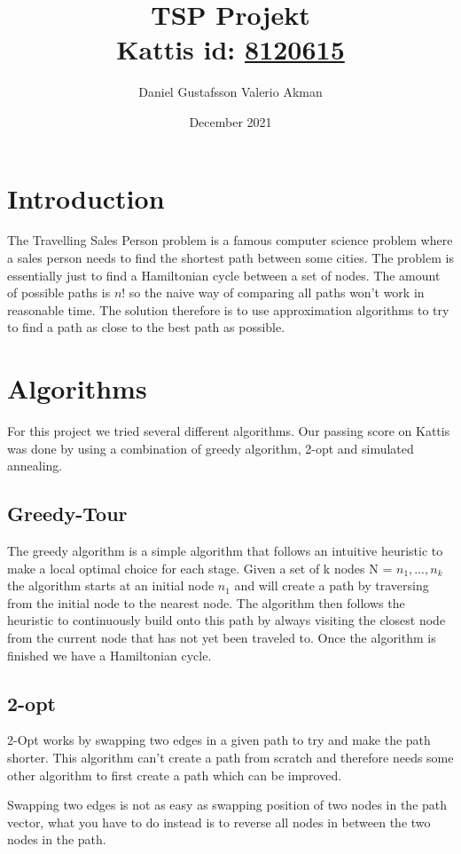 \documentclass{article}[11pt, a4paper]
\title{TSP Projekt \\ Kattis id: \href{https://kth.kattis.com/submissions/8120615}{8120615}}
\author{Daniel Gustafsson \cr Valerio Akman}
\date{December 2021}
\begin{document}
\maketitle

\section{Introduction}
The Travelling Sales Person problem is a famous computer science problem where a sales person needs to find the shortest path between some cities. The problem is essentially just to find a Hamiltonian cycle between a set of nodes. The amount of possible paths is $n!$ so the naive way of comparing all paths won't work in reasonable time. The solution therefore is to use approximation algorithms to try to find a path as close to the best path as possible.

\section{Algorithms}
For this project we tried several different algorithms. Our passing score on Kattis was done by using a combination of greedy algorithm, 2-opt and simulated annealing.

\subsection{Greedy-Tour}
The greedy algorithm is a simple algorithm that follows an intuitive heuristic to make a local optimal choice for each stage. Given a set of k nodes N = ${n_1,...,n_k}$ the algorithm starts at an initial node $n_1$ and will create a path by traversing from the initial node to the nearest node. The algorithm then follows the heuristic to continuously build onto this path by always visiting the closest node from the current node that has not yet been traveled to. Once the algorithm is finished we have a Hamiltonian cycle.

\subsection{2-opt}
2-Opt works by swapping two edges in a given path to try and make the path shorter. This algorithm can't create a path from scratch and therefore needs some other algorithm to first create a path which can be improved. 

Swapping two edges is not as easy as swapping position of two nodes in the path vector, what you have to do instead is to reverse all nodes in between the two nodes in the path.
\end{document}

